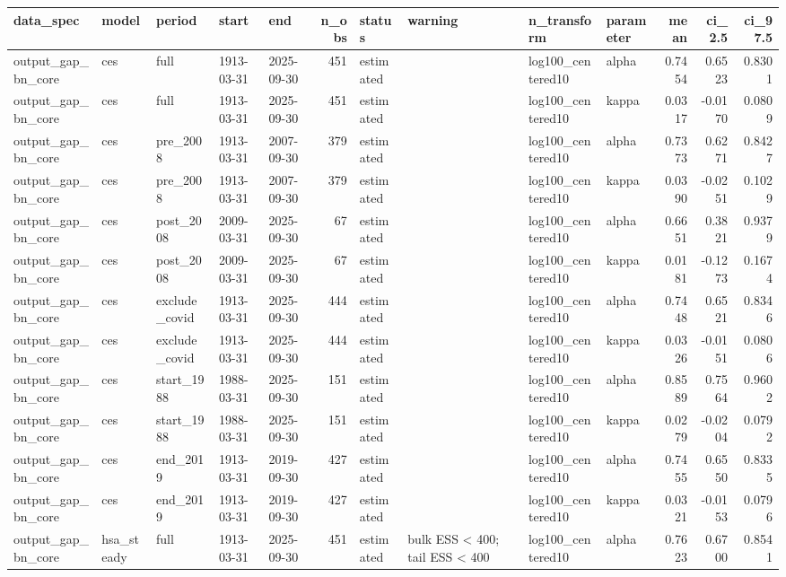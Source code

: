 \begin{tabular}{lllllrllllrrr}
\toprule
data\_spec & model & period & start & end & n\_obs & status & warning & n\_transform & parameter & mean & ci\_2.5 & ci\_97.5 \\
\midrule
output\_gap\_bn\_core & ces & full & 1913-03-31 & 2025-09-30 & 451 & estimated &  & log100\_centered10 & alpha & 0.7454 & 0.6523 & 0.8301 \\
output\_gap\_bn\_core & ces & full & 1913-03-31 & 2025-09-30 & 451 & estimated &  & log100\_centered10 & kappa & 0.0317 & -0.0170 & 0.0809 \\
output\_gap\_bn\_core & ces & pre\_2008 & 1913-03-31 & 2007-09-30 & 379 & estimated &  & log100\_centered10 & alpha & 0.7373 & 0.6271 & 0.8427 \\
output\_gap\_bn\_core & ces & pre\_2008 & 1913-03-31 & 2007-09-30 & 379 & estimated &  & log100\_centered10 & kappa & 0.0390 & -0.0251 & 0.1029 \\
output\_gap\_bn\_core & ces & post\_2008 & 2009-03-31 & 2025-09-30 & 67 & estimated &  & log100\_centered10 & alpha & 0.6651 & 0.3821 & 0.9379 \\
output\_gap\_bn\_core & ces & post\_2008 & 2009-03-31 & 2025-09-30 & 67 & estimated &  & log100\_centered10 & kappa & 0.0181 & -0.1273 & 0.1674 \\
output\_gap\_bn\_core & ces & exclude\_covid & 1913-03-31 & 2025-09-30 & 444 & estimated &  & log100\_centered10 & alpha & 0.7448 & 0.6521 & 0.8346 \\
output\_gap\_bn\_core & ces & exclude\_covid & 1913-03-31 & 2025-09-30 & 444 & estimated &  & log100\_centered10 & kappa & 0.0326 & -0.0151 & 0.0806 \\
output\_gap\_bn\_core & ces & start\_1988 & 1988-03-31 & 2025-09-30 & 151 & estimated &  & log100\_centered10 & alpha & 0.8589 & 0.7564 & 0.9602 \\
output\_gap\_bn\_core & ces & start\_1988 & 1988-03-31 & 2025-09-30 & 151 & estimated &  & log100\_centered10 & kappa & 0.0279 & -0.0204 & 0.0792 \\
output\_gap\_bn\_core & ces & end\_2019 & 1913-03-31 & 2019-09-30 & 427 & estimated &  & log100\_centered10 & alpha & 0.7455 & 0.6550 & 0.8335 \\
output\_gap\_bn\_core & ces & end\_2019 & 1913-03-31 & 2019-09-30 & 427 & estimated &  & log100\_centered10 & kappa & 0.0321 & -0.0153 & 0.0796 \\
output\_gap\_bn\_core & hsa\_steady & full & 1913-03-31 & 2025-09-30 & 451 & estimated & bulk ESS < 400; tail ESS < 400 & log100\_centered10 & alpha & 0.7623 & 0.6700 & 0.8541 \\

\end{tabular}

